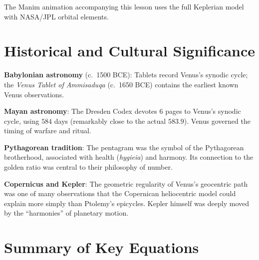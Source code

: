 \documentclass[11pt,letterpaper]{article}
\theoremstyle{definition}
\theoremstyle{plain}
\theoremstyle{remark}
\begin{document}
The Manim animation accompanying this lesson uses the full
Keplerian model with NASA/JPL orbital elements.


\section{Historical and Cultural Significance}
\label{sec:history}

\begin{historicalnote}
\textbf{Babylonian astronomy} (c.\ 1500 BCE): Tablets record Venus's
synodic cycle; the \textit{Venus Tablet of Ammisaduqa} (c.\ 1650 BCE)
contains the earliest known Venus observations.

\textbf{Mayan astronomy}: The Dresden Codex devotes 6 pages to Venus's
synodic cycle, using $584$ days (remarkably close to the actual
$583.9$). Venus governed the timing of warfare and ritual.

\textbf{Pythagorean tradition}: The pentagram was the symbol of the
Pythagorean brotherhood, associated with health (\textit{hygieia})
and harmony. Its connection to the golden ratio was central to their
philosophy of number.

\textbf{Copernicus and Kepler}: The geometric regularity of Venus's
geocentric path was one of many observations that the Copernican
heliocentric model could explain more simply than Ptolemy's epicycles.
Kepler himself was deeply moved by the ``harmonies'' of planetary
motion.
\end{historicalnote}


\section{Summary of Key Equations}
\label{sec:summary}
\end{document}
